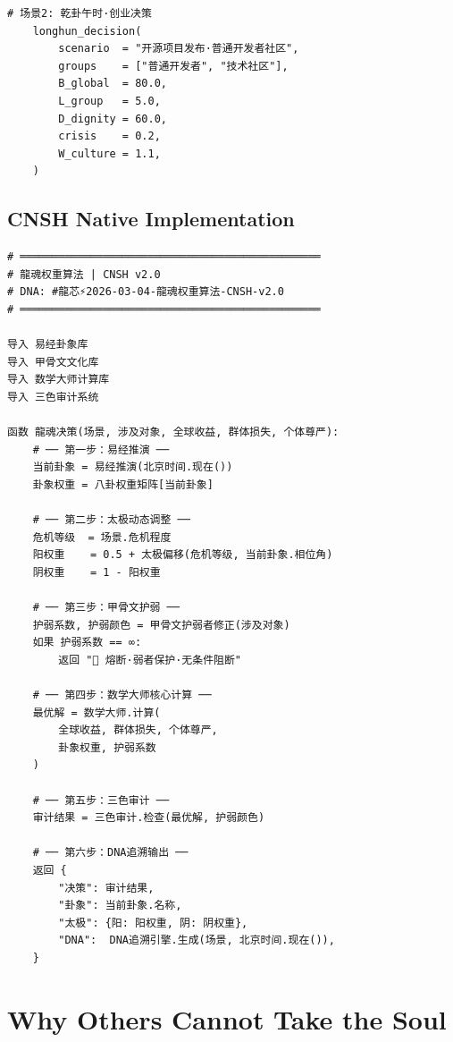 \documentclass[conference]{IEEEtran}
\begin{document}
\begin{lstlisting}[style=python,
  caption={LongHun Dynamic Weight Algorithm — Python v2.0},
  label={lst:python}]
    # 场景2: 乾卦午时·创业决策
    longhun_decision(
        scenario  = "开源项目发布·普通开发者社区",
        groups    = ["普通开发者", "技术社区"],
        B_global  = 80.0,
        L_group   = 5.0,
        D_dignity = 60.0,
        crisis    = 0.2,
        W_culture = 1.1,
    )
\end{lstlisting}

\subsection{CNSH Native Implementation}

\begin{lstlisting}[style=cnsh,
  caption={龍魂权重算法 — CNSH中文原生实现},
  label={lst:cnsh}]
# ═══════════════════════════════════════════════
# 龍魂权重算法 | CNSH v2.0
# DNA: #龍芯⚡️2026-03-04-龍魂权重算法-CNSH-v2.0
# ═══════════════════════════════════════════════

导入 易经卦象库
导入 甲骨文文化库
导入 数学大师计算库
导入 三色审计系统

函数 龍魂决策(场景, 涉及对象, 全球收益, 群体损失, 个体尊严):
    # ── 第一步：易经推演 ──
    当前卦象 = 易经推演(北京时间.现在())
    卦象权重 = 八卦权重矩阵[当前卦象]

    # ── 第二步：太极动态调整 ──
    危机等级  = 场景.危机程度
    阳权重    = 0.5 + 太极偏移(危机等级, 当前卦象.相位角)
    阴权重    = 1 - 阳权重

    # ── 第三步：甲骨文护弱 ──
    护弱系数, 护弱颜色 = 甲骨文护弱者修正(涉及对象)
    如果 护弱系数 == ∞:
        返回 "🔴 熔断·弱者保护·无条件阻断"

    # ── 第四步：数学大师核心计算 ──
    最优解 = 数学大师.计算(
        全球收益, 群体损失, 个体尊严,
        卦象权重, 护弱系数
    )

    # ── 第五步：三色审计 ──
    审计结果 = 三色审计.检查(最优解, 护弱颜色)

    # ── 第六步：DNA追溯输出 ──
    返回 {
        "决策": 审计结果,
        "卦象": 当前卦象.名称,
        "太极": {阳: 阳权重, 阴: 阴权重},
        "DNA":  DNA追溯引擎.生成(场景, 北京时间.现在()),
    }
\end{lstlisting}

\section{Why Others Cannot Take the Soul}
\label{sec:soul}
\end{document}
